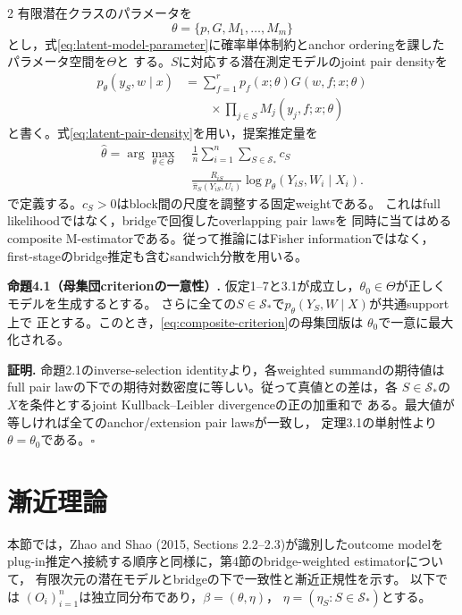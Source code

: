 \documentclass[a4paper,10pt]{article}
\begin{document}
\begin{multicols}{2}
有限潜在クラスのパラメータを
\begin{equation}
\theta=\{p,G,M_1,\ldots,M_m\}
\label{eq:latent-model-parameter}
\end{equation}
とし，式\eqref{eq:latent-model-parameter}に確率単体制約とanchor orderingを課した
パラメータ空間を$\Theta$と
する。$S$に対応する潜在測定モデルのjoint pair densityを
\begin{equation}
\begin{aligned}
p_\theta(y_S,w\mid x)
&=\sum_{f=1}^r p_f(x;\theta)G(w,f;x;\theta)\\[-1mm]
&\qquad\times\prod_{j\in S}M_j(y_j,f;x;\theta)
\end{aligned}
\label{eq:latent-pair-density}
\end{equation}
と書く。式\eqref{eq:latent-pair-density}を用い，提案推定量を
\begin{equation}
\begin{aligned}
\widehat\theta=\arg\max_{\theta\in\Theta}\;&\frac1n\sum_{i=1}^n
 \sum_{S\in\mathcal S_*}c_S\\[-1mm]
&\frac{R_{iS}}{\widehat\pi_S(Y_{iS},U_i)}
 \log p_\theta(Y_{iS},W_i\mid X_i).
\end{aligned}
\label{eq:composite-criterion}
\end{equation}
で定義する。$c_S>0$はblock間の尺度を調整する固定weightである。
これはfull likelihoodではなく，bridgeで回復したoverlapping pair lawsを
同時に当てはめるcomposite M-estimatorである。従って推論にはFisher
informationではなく，first-stageのbridge推定も含むsandwich分散を用いる。

\noindent\textbf{命題4.1（母集団criterionの一意性）.}
仮定1--7と3.1が成立し，$\theta_0\in\Theta$が正しくモデルを生成するとする。
さらに全ての$S\in\mathcal S_*$で$p_\theta(Y_S,W\mid X)$が共通support上で
正とする。このとき，\eqref{eq:composite-criterion}の母集団版は
$\theta_0$で一意に最大化される。

\noindent\textbf{証明.}
命題2.1のinverse-selection identityより，各weighted summandの期待値は
full pair lawの下での期待対数密度に等しい。従って真値との差は，各
$S\in\mathcal S_*$の$X$を条件とするjoint Kullback--Leibler divergenceの正の加重和で
ある。最大値が等しければ全てのanchor/extension pair lawsが一致し，
定理3.1の単射性より$\theta=\theta_0$である。\hfill$\square$

\section{漸近理論}
本節では，Zhao and Shao (2015, Sections 2.2--2.3)が識別したoutcome modelを
plug-in推定へ接続する順序と同様に，第4節のbridge-weighted estimatorについて，
有限次元の潜在モデルとbridgeの下で一致性と漸近正規性を示す。
以下では
$(O_i)_{i=1}^n$は独立同分布であり，$\beta=(\theta,\eta)$，
$\eta=(\eta_S:S\in\mathcal S_*)$とする。


\end{multicols}
\end{document}
